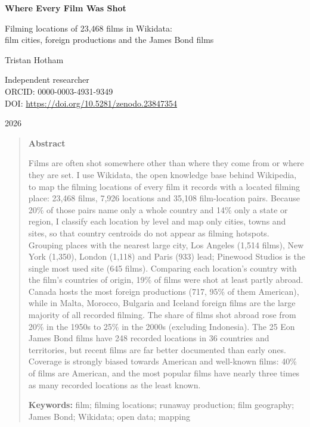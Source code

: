 \documentclass[11pt,a4paper]{article}
\begin{document}
\begin{center}
{\Large\bfseries Where Every Film Was Shot\par}
\vspace{0.4em}
{\large Filming locations of 23,468 films in Wikidata:\\film cities, foreign productions and the James Bond films\par}
\vspace{1.2em}
{\large Tristan Hotham\par}
\vspace{0.3em}
{\small Independent researcher\\
ORCID: 0000-0003-4931-9349\\
DOI: \href{https://doi.org/10.5281/zenodo.23847354}{https://doi.org/10.5281/zenodo.23847354}\par}
\vspace{0.8em}
2026
\end{center}

\begin{quote}
\small
\begin{center}\textbf{Abstract}\end{center}
Films are often shot somewhere other than where they come from or where they are set. I use Wikidata, the open knowledge base behind Wikipedia, to map the filming locations of every film it records with a located filming place: 23,468 films, 7,926 locations and 35,108 film-location pairs. Because 20\% of those pairs name only a whole country and 14\% only a state or region, I classify each location by level and map only cities, towns and sites, so that country centroids do not appear as filming hotspots. Grouping places with the nearest large city, Los Angeles (1,514 films), New York (1,350), London (1,118) and Paris (933) lead; Pinewood Studios is the single most used site (645 films). Comparing each location's country with the film's countries of origin, 19\% of films were shot at least partly abroad. Canada hosts the most foreign productions (717, 95\% of them American), while in Malta, Morocco, Bulgaria and Iceland foreign films are the large majority of all recorded filming. The share of films shot abroad rose from 20\% in the 1950s to 25\% in the 2000s (excluding Indonesia). The 25 Eon James Bond films have 248 recorded locations in 36 countries and territories, but recent films are far better documented than early ones. Coverage is strongly biased towards American and well-known films: 40\% of films are American, and the most popular films have nearly three times as many recorded locations as the least known.

\textbf{Keywords:} film; filming locations; runaway production; film geography; James Bond; Wikidata; open data; mapping
\end{quote}
\end{document}
